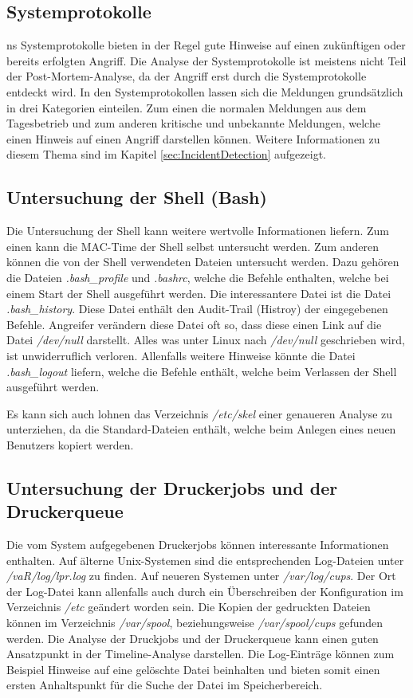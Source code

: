 \subsection{Systemprotokolle}ns
Systemprotokolle bieten in der Regel gute Hinweise auf einen zukünftigen oder bereits erfolgten Angriff. Die Analyse der Systemprotokolle ist meistens nicht Teil der Post-Mortem-Analyse, da der Angriff erst durch die Systemprotokolle entdeckt wird. In den Systemprotokollen lassen sich die Meldungen grundsätzlich in drei Kategorien einteilen. Zum einen die normalen Meldungen aus dem Tagesbetrieb und zum anderen kritische und unbekannte Meldungen, welche einen Hinweis auf einen Angriff darstellen können. Weitere Informationen zu diesem Thema sind im Kapitel \ref{sec:IncidentDetection}  aufgezeigt.



\subsection{Untersuchung der Shell (Bash)}
Die Untersuchung der Shell kann weitere wertvolle Informationen liefern. Zum einen kann die MAC-Time der Shell selbst untersucht werden. Zum anderen können die von der Shell verwendeten Dateien untersucht werden. Dazu gehören die Dateien \textit{.bash\_profile} und \textit{.bashrc}, welche die Befehle enthalten, welche bei einem Start der Shell ausgeführt werden. Die interessantere Datei ist die Datei \textit{.bash\_history}. Diese Datei enthält den Audit-Trail (Histroy) der eingegebenen Befehle. Angreifer verändern diese Datei oft so, dass diese einen Link auf die Datei \textit{/dev/null} darstellt. Alles was unter Linux nach \textit{/dev/null} geschrieben wird, ist unwiderruflich verloren. Allenfalls weitere Hinweise könnte die Datei \textit{.bash\_logout} liefern, welche die Befehle enthält, welche beim Verlassen der Shell ausgeführt werden.

Es kann sich auch lohnen das Verzeichnis \textit{/etc/skel} einer genaueren Analyse zu unterziehen, da die Standard-Dateien enthält, welche beim Anlegen eines neuen Benutzers kopiert werden.
	

\subsection{Untersuchung der Druckerjobs und der Druckerqueue}
Die vom System aufgegebenen Druckerjobs können interessante Informationen enthalten. Auf älterne Unix-Systemen sind die entsprechenden Log-Dateien unter \textit{/vaR/log/lpr.log} zu finden. Auf neueren Systemen unter \textit{/var/log/cups}. Der Ort der Log-Datei kann allenfalls auch durch ein Überschreiben der Konfiguration im Verzeichnis \textit{/etc} geändert worden sein. Die Kopien der gedruckten Dateien können im Verzeichnis \textit{/var/spool}, beziehungsweise \textit{/var/spool/cups} gefunden werden. Die Analyse der Druckjobs und der Druckerqueue kann einen guten Ansatzpunkt in der Timeline-Analyse darstellen. Die Log-Einträge können zum Beispiel Hinweise auf eine gelöschte Datei beinhalten und bieten somit einen ersten Anhaltspunkt für die Suche der Datei im Speicherbereich.



